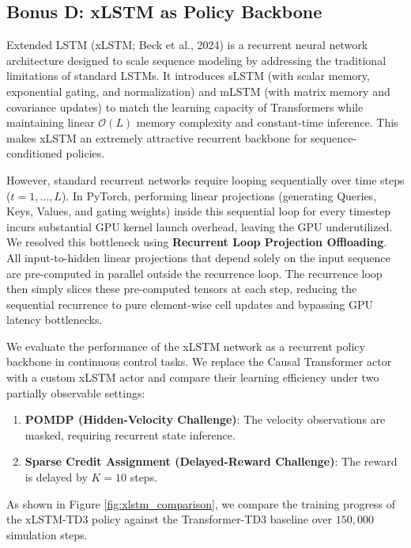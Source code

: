 \documentclass[11pt,a4paper]{article}
\begin{document}
\FloatBarrier

\subsection{Bonus D: xLSTM as Policy Backbone}
Extended LSTM (xLSTM; Beck et al., 2024) is a recurrent neural network architecture designed to scale sequence modeling by addressing the traditional limitations of standard LSTMs. It introduces sLSTM (with scalar memory, exponential gating, and normalization) and mLSTM (with matrix memory and covariance updates) to match the learning capacity of Transformers while maintaining linear $\mathcal{O}(L)$ memory complexity and constant-time inference. This makes xLSTM an extremely attractive recurrent backbone for sequence-conditioned policies.

However, standard recurrent networks require looping sequentially over time steps ($t = 1, \dots, L$). In PyTorch, performing linear projections (generating Queries, Keys, Values, and gating weights) inside this sequential loop for every timestep incurs substantial GPU kernel launch overhead, leaving the GPU underutilized. We resolved this bottleneck using \textbf{Recurrent Loop Projection Offloading}. All input-to-hidden linear projections that depend solely on the input sequence are pre-computed in parallel outside the recurrence loop. The recurrence loop then simply slices these pre-computed tensors at each step, reducing the sequential recurrence to pure element-wise cell updates and bypassing GPU latency bottlenecks.

We evaluate the performance of the xLSTM network as a recurrent policy backbone in continuous control tasks. We replace the Causal Transformer actor with a custom xLSTM actor and compare their learning efficiency under two partially observable settings:
\begin{enumerate}
    \item \textbf{POMDP (Hidden-Velocity Challenge)}: The velocity observations are masked, requiring recurrent state inference.
    \item \textbf{Sparse Credit Assignment (Delayed-Reward Challenge)}: The reward is delayed by $K=10$ steps.
\end{enumerate}

As shown in Figure \ref{fig:xlstm_comparison}, we compare the training progress of the xLSTM-TD3 policy against the Transformer-TD3 baseline over $150,000$ simulation steps.
\end{document}
